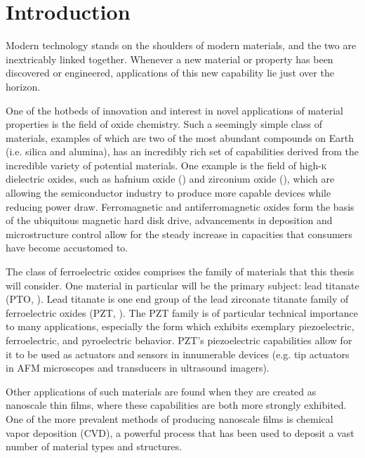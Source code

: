 \chapter{Introduction}
\label{ch:Intro}
\thispagestyle{empty}



Modern technology stands on the shoulders of modern materials, and the two are inextricably linked together. Whenever a new material or property has been discovered or engineered, applications of this new capability lie just over the horizon. 

One of the hotbeds of innovation and interest in novel applications of material properties is the field of oxide chemistry. Such a seemingly simple class of materials, examples of which are two of the most abundant compounds on Earth (i.e. silica and alumina), has an incredibly rich set of capabilities derived from the incredible variety of potential materials. One example is the field of high-\textsc{k} dielectric oxides, such as hafnium oxide () and zirconium oxide (),\cite{chen_atomic_2007,fischer_batch_2008} which are allowing the semiconductor industry to produce more capable devices while reducing power draw. Ferromagnetic and antiferromagnetic oxides form the basis of the ubiquitous magnetic hard disk drive, advancements in deposition and microstructure control allow for the steady increase in capacities that consumers have become accustomed to.\cite{scheffe_atomic_2009}

The class of ferroelectric oxides comprises the family of materials that this thesis will consider. One material in particular will be the primary subject: lead titanate (PTO, \PTO{}).\cite{harjuoja_2006,lee_effects_2009} Lead titanate is one end group of the lead zirconate titanate family of ferroelectric oxides (PZT, ).\cite{Muralt_2000} The PZT family is of particular technical importance to many applications, especially the  form which exhibits exemplary piezoelectric, ferroelectric, and pyroelectric behavior. PZT's piezoelectric capabilities allow for it to be used as actuators and sensors in innumerable devices (e.g. tip actuators in AFM microscopes and transducers in ultrasound imagers). 

Other applications of such materials are found when they are created as nanoscale thin films, where these capabilities are both more strongly exhibited. One of the more prevalent methods of producing nanoscale films is chemical vapor deposition (CVD), a powerful process that has been used to deposit a vast number of material types and structures.\cite{Matsumara_1998}

